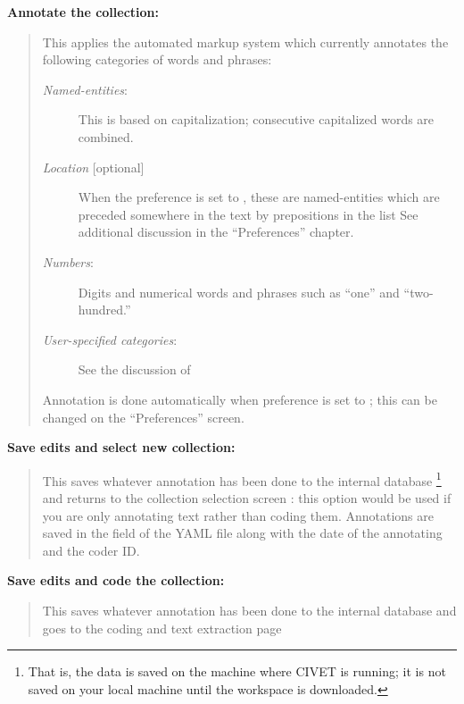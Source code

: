 \documentclass[letterpaper,10pt,english]{sphinxmanual}
\begin{document}
\textbf{Annotate the collection:}
\begin{quote}

This applies the automated markup system which currently annotates the following
categories of words and phrases:
\begin{description}
\item[{\emph{Named-entities}:}] \leavevmode
This is based on capitalization; consecutive capitalized words
are combined.

\item[{\emph{Location} {[}optional{]}}] \leavevmode
When the  preference is set to
, these are named-entities which are preceded somewhere in the
text by prepositions in the list  See
additional discussion in the “Preferences” chapter.

\item[{\emph{Numbers}:}] \leavevmode
Digits and numerical words and phrases such as “one” and
“two-hundred.”

\item[{\emph{User-specified categories}:}] \leavevmode
See the discussion of {\hyperref[workspaces:sec-categories]{\emph{}}}

\end{description}

Annotation is done automatically when  preference is
set to ; this can be changed on the “Preferences” screen.
\end{quote}

\textbf{Save edits and select new collection:}
\begin{quote}

This saves whatever annotation has been done to the internal
database \footnote{
That is, the data is saved on the machine where CIVET is running; it
is not saved on your local machine until the workspace is downloaded.
} and returns to the collection selection screen :
this option would be used if you are only annotating text rather
than coding them. Annotations are saved in the  field
of the YAML file along with the date of the annotating and the
coder ID.
\end{quote}

\textbf{Save edits and code the collection:}
\begin{quote}

This saves whatever annotation has been done to the internal
database and goes to the coding and text extraction page
\end{quote}
\end{document}
